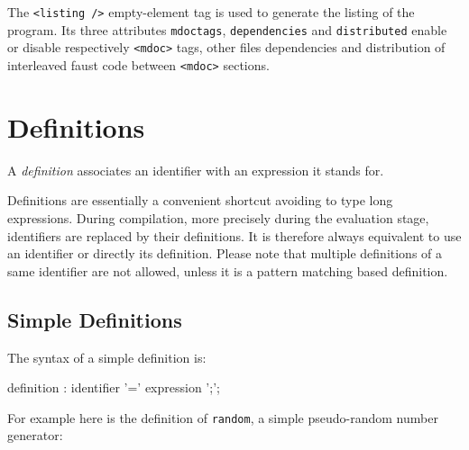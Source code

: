 
The \lstinline'<listing />' empty-element tag is used to generate the listing of the \faust program. Its three attributes \lstinline'mdoctags', \lstinline'dependencies' and \lstinline'distributed' enable or disable respectively \lstinline'<mdoc>' tags, other files dependencies and distribution of interleaved faust code between \lstinline'<mdoc>' sections.

\section{Definitions}

A \textit{definition} associates an identifier with an expression it stands for. 

Definitions are essentially a convenient shortcut avoiding to type long expressions. During compilation, more precisely during the evaluation stage, identifiers are replaced by their definitions. It is therefore always equivalent to use an identifier or directly its definition. Please note that multiple definitions of a same identifier are not allowed, unless it is a pattern matching based definition.

\subsection{Simple Definitions}

The syntax of a simple definition is:

\begin{rail}
definition  : identifier '=' expression ';';
\end{rail} 

For example here is the definition of \lstinline'random', a simple pseudo-random number generator:

